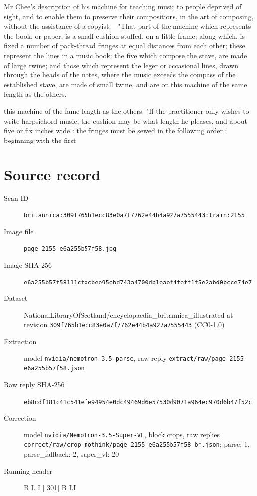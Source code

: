 \documentclass{article}
\begin{document}
Mr Chee's description of his machine for teaching music to people deprived of sight, and to enable them to preserve their compositions, in the art of composing, without the assistance of a copyist.—"That part of the machine which represents the book, or paper, is a small cushion stuffed, on a little frame; along which, is fixed a number of pack-thread fringes at equal distances from each other; these represent the lines in a music book: the five which compose the stave, are made of large twine; and those which represent the leger or occasional lines, drawn through the heads of the notes, where the music exceeds the compass of the established stave, are made of small twine, and are on this machine of the same length as the others.

this machine of the fame length as the others.
"If the practitioner only wishes to write harpsichord
music, the cushion may be what length he pleases, and
about five or fix inches wide : the fringes must be
sewed in the following order ; beginning with the first


\section*{Source record}
\begin{description}
\item[Scan ID] \texttt{britannica:309f765b1ecc83e0a7f7762e44b4a927a7555443:train:2155}
\item[Image file] \texttt{page-2155-e6a255b57f58.jpg}
\item[Image SHA-256] \texttt{e6a255b57f58111cfacbee95ebd743a4700db1eaef4feff1f5e2abd0bcce74e7}
\item[Dataset] NationalLibraryOfScotland/encyclopaedia\_britannica\_illustrated at revision \texttt{309f765b1ecc83e0a7f7762e44b4a927a7555443} (CC0-1.0)
\item[Extraction] model \texttt{nvidia/nemotron-3.5-parse}, raw reply \texttt{extract/raw/page-2155-e6a255b57f58.json}
\item[Raw reply SHA-256] \texttt{eb8cdf181c41c541efe94954e0dc49469d6e57530d9071a964ec970d6b47f52c}
\item[Correction] model \texttt{nvidia/Nemotron-3.5-Super-VL}, block crops, raw replies \texttt{correct/raw/crop\_nothink/page-2155-e6a255b57f58-b*.json}; parse: 1, parse\_fallback: 2, super\_vl: 20
\item[Running header] B L I [ 301] B LI
\end{description}
\end{document}
